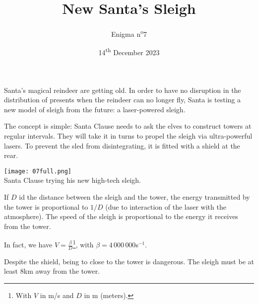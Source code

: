 \documentclass[a4paper, top=10mm]{article}
\title{\textbf{\huge{New Santa's Sleigh}}}
\author{Enigma n\textsuperscript{o}7}
\date{14\textsuperscript{th} December 2023}
\begin{document}
	\maketitle
	
	Santa's magical reindeer are getting old.
	In order to have no disruption in the distribution of presents when the reindeer can no longer fly, Santa is testing a new model of sleigh from the future: a laser-powered sleigh.
	
	The concept is simple: Santa Clause needs to ask the elves to construct towers at regular intervals.
	They will take it in turns to propel the sleigh via ultra-powerful lasers.
	To prevent the sled from disintegrating, it is fitted with a shield at the rear.
	
	\begin{center}
		\texttt{[image: 07full.png]}\\
		Santa Clause trying his new high-tech sleigh.
	\end{center}
	
	If $D$ id the distance between the sleigh and the tower, the energy transmitted by the tower is proportional to $1/D$ (due to interaction of the laser with the atmosphere).
	The speed of the sleigh is proportional to the energy it receives from the tower.
	
	In fact, we have $V = \frac{\beta}{D}$\footnote{With $V$ in m/s and $D$ in m (meters).}, with $\beta=4\,000\,000$s$ ^{-1}$.
	
	Despite the shield, being to close to the tower is dangerous.
	The sleigh must be at least $8$km away from the tower.
	
	
\end{document}
